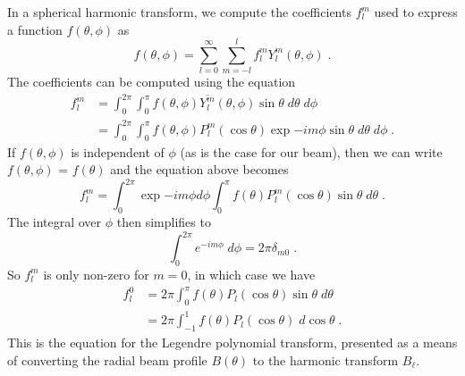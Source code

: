 In a spherical harmonic transform, we compute the coefficients $f_{l}^{m}$ used to express a function $f (\theta,\phi)$ as
\begin{equation}
    f(\theta,\phi) = \sum_{l=0}^{\infty}\sum_{m=-l}^{l}f_{l}^{m} Y_l^m(\theta,\phi) \; .
\end{equation} 
The coefficients can be computed using the equation 
\begin{subequations}
\begin{align}
    f_{l}^{m} &= \int_{0}^{2\pi}\int_{0}^{\pi} f(\theta,\phi) \overline{Y_l^m}(\theta,\phi)\sin\theta \; d\theta\; d\phi   \\
    & = \int_{0}^{2\pi}\int_{0}^{\pi} f(\theta,\phi) P_{l}^{m}(\cos\theta)\exp{-im\phi} \sin\theta\; d\theta\; d\phi \; .
\end{align}
\end{subequations}
If $f (\theta,\phi)$ is independent of $\phi$ (as is the case for our beam), then we can write $f (\theta,\phi)$ = $f (\theta)$ and the equation above becomes
\begin{equation}
    f_{l}^{m}= \int_{0}^{2\pi}\exp{-im\phi}d\phi\int_{0}^{\pi} f(\theta) P_{l}^{m}(\cos\theta) \sin\theta\; d\theta \; .
\end{equation}
The integral over $\phi$ then simplifies to 
\begin{equation}
    \int_0^{2\pi} e^{-im\phi}\; d\phi = 2\pi \delta_{m0}\; .
\end{equation}
So $f_l^m$ is only non-zero for $m=0$, in which case we have 
\begin{subequations}
\begin{align}
    f_l^0 & =  2\pi\int_0^{\pi}f(\theta)P_l(\cos\theta)\sin\theta \; d\theta\\
    & = 2\pi \int_{-1}^{1}f(\theta)P_l (\cos\theta) \; d\cos \theta\; .
\end{align}
\end{subequations}
This is the equation for the Legendre polynomial transform, presented as a means of converting the radial beam profile $B(\theta)$ to the harmonic transform $B_{\ell}$. 



